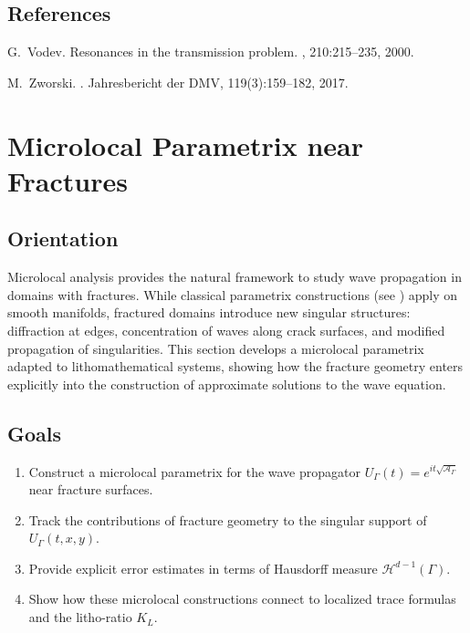 \subsection*{References}
\begin{thebibliography}{99}

G.~Vodev.
\newblock Resonances in the transmission problem.
, 210:215--235, 2000.

M.~Zworski.
.
\newblock Jahresbericht der DMV, 119(3):159--182, 2017.

\end{thebibliography}

\section{Microlocal Parametrix near Fractures}

\subsection*{Orientation}
Microlocal analysis provides the natural framework to study wave propagation 
in domains with fractures. While classical parametrix constructions (see 
\cite{Hormander1985,GrigisSjo1994}) apply on smooth manifolds, fractured 
domains introduce new singular structures: diffraction at edges, concentration 
of waves along crack surfaces, and modified propagation of singularities. 
This section develops a microlocal parametrix adapted to lithomathematical 
systems, showing how the fracture geometry enters explicitly into the 
construction of approximate solutions to the wave equation.

\subsection*{Goals}
\begin{enumerate}[label=G\arabic*]
  \item Construct a microlocal parametrix for the wave propagator 
  $U_\Gamma(t) = e^{it\sqrt{\mathcal{A}_\Gamma}}$ near fracture surfaces.
  \item Track the contributions of fracture geometry to the singular support 
  of $U_\Gamma(t,x,y)$.
  \item Provide explicit error estimates in terms of Hausdorff measure 
  $\mathcal{H}^{d-1}(\Gamma)$.
  \item Show how these microlocal constructions connect to localized trace 
  formulas and the litho-ratio $K_L$.
\end{enumerate}

